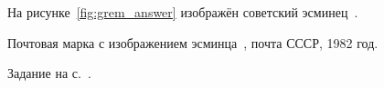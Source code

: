 \newpage
\begin{task}
На рисунке~\ref{fig:grem_answer} изображён советский эсминец~.

\label{answer:ship_2}
\begin{marginfigure}[0.0cm]
		{
		  \setlength{\fboxsep}{0pt}%
		  \setlength{\fboxrule}{1pt}%
		}
        \caption[Эсминец <<Гремящий>>.]{Почтовая марка с изображением эсминца~, почта СССР, 1982 год.}%
		\label{fig:grem_answer}%
	  \end{marginfigure}

\small{Задание на с.~\pageref{question:ship_2}.}
\end{task}



